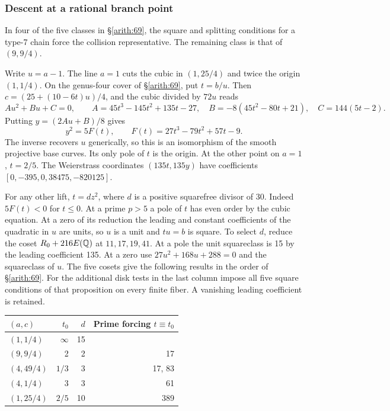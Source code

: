 \subsubsection{Descent at a rational branch point}\label{arith:70}

In four of the five classes in \S\ref{arith:69}, the
square and splitting conditions for a type-7 chain force the collision
representative. The remaining class is that of \((9,9/4)\).

Write \(u=a-1\). The line \(a=1\) cuts the cubic in \((1,25/4)\) and
twice the origin \((1,1/4)\). On the genus-four cover of \S\ref{arith:69}, put
\(t=b/u\). Then \(c=(25+(10-6t)u)/4\), and the cubic divided by
\(72u\) reads
\[A u^2+B u+C=0,\qquad
 A=45t^3-145t^2+135t-27,\quad
 B=-8(45t^2-80t+21),\quad C=144(5t-2).\]
Putting \(y=(2Au+B)/8\) gives
\[y^2=5F(t),\qquad F(t)=27t^3-79t^2+57t-9.\]
The inverse recovers \(u\) generically, so this is an isomorphism
of the smooth projective base curves. Its only pole of \(t\) is the
origin. At the other point on \(a=1\), \(t=2/5\). The Weierstrass
coordinates \((135t,135y)\) have coefficients
\([0,-395,0,38475,-820125]\).

For any other lift, \(t=d z^2\), where \(d\) is a positive squarefree
divisor of 30. Indeed \(5F(t)<0\) for \(t\le0\). At a prime \(p>5\)
a pole of \(t\) has even order by the cubic equation. At a zero of
its reduction the leading and constant coefficients of the quadratic
in \(u\) are units, so \(u\) is a unit and \(tu=b\) is square.
To select \(d\), reduce the coset \(R_0+216E(\mathbb Q)\) at
\(11,17,19,41\). At a pole the unit squareclass is 15 by the leading
coefficient 135. At a zero use \(27u^2+168u+288=0\) and the
squareclass of \(u\). The five cosets give the following results in the
order of \S\ref{arith:69}. For the additional disk tests in the last
column impose all five square conditions of that proposition on every
finite fiber. A vanishing leading coefficient is retained.

{
\begin{longtable}[]{@{}lrrr@{}}
\toprule\noalign{}
\((a,c)\) & \(t_0\) & \(d\) & Prime forcing \(t\equiv t_0\) \\
\midrule\noalign{}
\endhead
\bottomrule\noalign{}
\endlastfoot
\((1,1/4)\) & \(\infty\) & 15 & \\
\((9,9/4)\) & 2 & 2 & 17 \\
\((4,49/4)\) & \(1/3\) & 3 & 17, 83 \\
\((4,1/4)\) & 3 & 3 & 61 \\
\((1,25/4)\) & \(2/5\) & 10 & 389 \\
\end{longtable}
}

